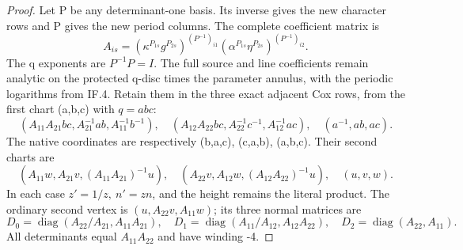 \begin{proof}
Let P be any determinant-one basis.  Its inverse gives the new
character rows and P gives the new period columns.  The complete
coefficient matrix is
\[
 A_{is}=(\kappa^{P_{1s}}g^{P_{2s}})^{(P^{-1})_{i1}}
        (\alpha^{P_{1s}}\eta^{P_{2s}})^{(P^{-1})_{i2}}.
 \tag{IF.21}
\]
The q exponents are \(P^{-1}P=I\).  The full source and line
coefficients remain analytic on the protected q-disc times the
parameter annulus, with the periodic logarithms from IF.4.  Retain
them in the three exact adjacent Cox rows, from the first chart
(a,b,c) with \(q=abc\):
\[
 (A_{11}A_{21}bc,A_{21}^{-1}ab,A_{11}^{-1}b^{-1}),\quad
 (A_{12}A_{22}bc,A_{22}^{-1}c^{-1},A_{12}^{-1}ac),\quad
 (a^{-1},ab,ac).
 \tag{IF.22}
\]
The native coordinates are respectively (b,a,c), (c,a,b), (a,b,c).
Their second charts are
\[
 (A_{11}w,A_{21}v,(A_{11}A_{21})^{-1}u),\quad
 (A_{22}v,A_{12}w,(A_{12}A_{22})^{-1}u),\quad(u,v,w).
 \tag{IF.23}
\]
In each case \(z'=1/z,\ n'=zn\), and the height remains the
literal product.  The ordinary second vertex is
\((u,A_{22}v,A_{11}w)\); its three normal matrices are
\[
 D_0=\operatorname{diag}(A_{22}/A_{21},A_{11}A_{21}),\quad
 D_1=\operatorname{diag}(A_{11}/A_{12},A_{12}A_{22}),\quad
 D_2=\operatorname{diag}(A_{22},A_{11}).
 \tag{IF.24}
\]
All determinants equal \(A_{11}A_{22}\) and have winding -4.


\end{proof}
